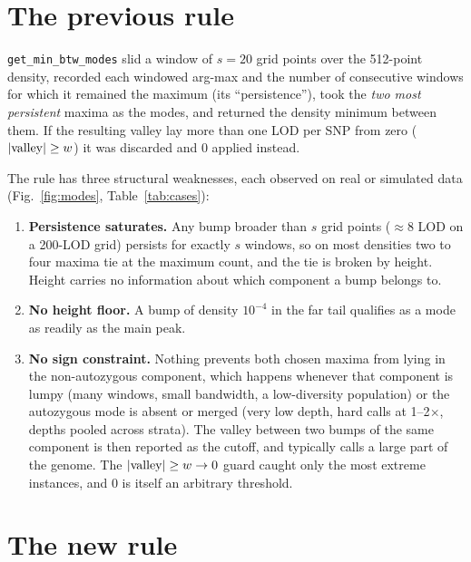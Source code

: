 \documentclass[11pt]{article}
\newcommand{\code}[1]{\texttt{#1}}
\begin{document}
\section{The previous rule}
\label{sec:old}

\code{get\_min\_btw\_modes} slid a window of $s=20$ grid points over the 512-point density, recorded each windowed arg-max and the number of consecutive windows for which it remained the maximum (its ``persistence''), took the \emph{two most persistent} maxima as the modes, and returned the density minimum between them. If the resulting valley lay more than one LOD per SNP from zero ($|{\rm valley}|\ge w$) it was discarded and 0 applied instead.

The rule has three structural weaknesses, each observed on real or simulated data (Fig.~\ref{fig:modes}, Table~\ref{tab:cases}):
\begin{enumerate}[nosep]
\item \textbf{Persistence saturates.} Any bump broader than $s$ grid points ($\approx 8$ LOD on a 200-LOD grid) persists for exactly $s$ windows, so on most densities two to four maxima tie at the maximum count, and the tie is broken by height. Height carries no information about which component a bump belongs to.
\item \textbf{No height floor.} A bump of density $10^{-4}$ in the far tail qualifies as a mode as readily as the main peak.
\item \textbf{No sign constraint.} Nothing prevents both chosen maxima from lying in the non-autozygous component, which happens whenever that component is lumpy (many windows, small bandwidth, a low-diversity population) or the autozygous mode is absent or merged (very low depth, hard calls at 1--2$\times$, depths pooled across strata). The valley between two bumps of the same component is then reported as the cutoff, and typically calls a large part of the genome. The $|{\rm valley}|\ge w\to 0$ guard caught only the most extreme instances, and 0 is itself an arbitrary threshold.
\end{enumerate}

\section{The new rule}
\label{sec:new}
\end{document}

